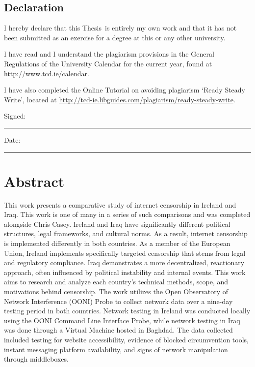 \documentclass[a4paper,oneside,12pt]{book}
\title{\thesistitle}
\author{\authorname}
\newcommand{\typeofthesis}{Thesis} %
\begin{document}

\doublespacing

\section*{Declaration}
I hereby declare that this \typeofthesis\ is entirely my own work and that it has not been submitted as an exercise for a degree at this or any other university.

I have read and I understand the plagiarism provisions in the General Regulations of the University Calendar for the current year, found at \url{http://www.tcd.ie/calendar}.

I have also completed the Online Tutorial on avoiding plagiarism `Ready Steady Write', located at \url{http://tcd-ie.libguides.com/plagiarism/ready-steady-write}.
\vspace{1cm}

Signed:~\rule{5cm}{0.3pt}\hfill Date:~\rule{5cm}{0.3pt}


\newpage
\chapter{Abstract}

This work presents a comparative study of internet censorship in Ireland and Iraq. This work is one of many in a series of such comparisons and was completed alongside Chris Casey. Ireland and Iraq have significantly different political structures, legal frameworks, and cultural norms. As a result, internet censorship is implemented differently in both countries. As a member of the European Union, Ireland implements specifically targeted censorship that stems from legal and regulatory compliance. Iraq demonstrates a more decentralized, reactionary approach, often influenced by political instability and internal events. This work aims to research and analyze each country's technical methods, scope, and motivations behind censorship. The work utilizes the Open Observatory of Network Interference (OONI) Probe to collect network data over a nine-day testing period in both countries. Network testing in Ireland was conducted locally using the OONI Command Line Interface Probe, while network testing in Iraq was done through a Virtual Machine hosted in Baghdad. The data collected included testing for website accessibility, evidence of blocked circumvention tools, instant messaging platform availability, and signs of network manipulation through middleboxes.
\end{document}
